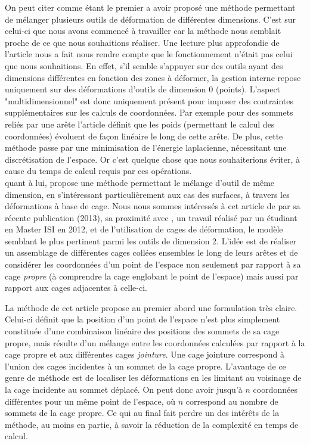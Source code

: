 On peut citer \cite{JBPS11} comme étant le premier a avoir proposé une
méthode permettant de mélanger plusieurs outils de déformation de
différentes dimensions.  C'est sur celui-ci que nous avons commencé à
travailler car la méthode nous semblait proche de ce que nous
souhaitions réaliser. Une lecture plus approfondie de l'article nous a
fait nous rendre compte que le fonctionnement n'était pas celui que
nous souhaitions. En effet, s'il semble s'appuyer sur des outils ayant
des dimensions différentes en fonction des zones à déformer, la
gestion interne repose uniquement sur des déformations d'outils de
dimension 0 (points). L'aspect "multidimensionnel" est donc uniquement
présent pour imposer des contraintes supplémentaires sur les calculs
de coordonnées. Par exemple pour des sommets reliés par une arête
l'article définit que les poids (permettant le calcul des coordonnées)
évoluent de façon linéaire le long de cette arête. De plus, cette
méthode passe par une minimisation de l'énergie laplacienne,
nécessitant une discrétisation de l'espace. Or c'est quelque chose que
nous souhaiterions éviter, à cause du temps de calcul requis par ces
opérations.
\\

\cite{GPCP13} quant à lui, propose une méthode permettant le mélange
d'outil de même dimension, en s'intéressant particulièrement aux cas
des surfaces, à travers les déformations à base de cage.  Nous nous
sommes intéressés à cet article de par sa récente publication (2013),
sa proximité avec \cite{Hur12}, un travail réalisé par un étudiant en
Master ISI en 2012, et de l'utilisation de cages de déformation, le
modèle semblant le plus pertinent parmi les outils de dimension 2.
L'idée est de réaliser un assemblage de différentes cages collées
ensembles le long de leurs arêtes et de considérer les coordonnées
d'un point de l'espace non seulement par rapport à sa cage
\textit{propre} (à comprendre la cage englobant le point de l'espace)
mais aussi par rapport aux cages adjacentes à celle-ci.

La méthode de cet article propose au premier abord une formulation
très claire. Celui-ci définit que la position d'un point de l'espace
n'est plus simplement constituée d'une combinaison linéaire des
positions des sommets de sa cage propre, mais résulte d'un mélange
entre les coordonnées calculées par rapport à la cage propre et aux
différentes cages \textit{jointure}. Une cage jointure correspond à
l'union des cages incidentes à un sommet de la cage propre. L'avantage
de ce genre de méthode est de localiser les déformations en les
limitant au voisinage de la cage incidente au sommet déplacé. On peut
donc avoir jusqu'à $n$ coordonnées différentes pour un même point de
l'espace, où $n$ correspond au nombre de sommets de la cage propre. Ce
qui au final fait perdre un des intérêts de la méthode, au moins en
partie, à savoir la réduction de la complexité en temps de calcul.

